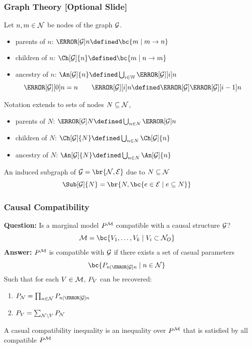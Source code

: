 \documentclass[
    hyperref={colorlinks=true, linkcolor=blue, urlcolor=blue, citecolor=MidnightBlue},
    xcolor={dvipsnames},
]{beamer}
\renewcommand{\term}[1]{\textcolor{Mahogany}{#1}}
\begin{document}
\begin{frame}
    \frametitle{Graph Theory [Optional Slide]}
    Let $n, m \in \mathcal{N}$ be nodes of the graph $\mathcal{G}$.
    \begin{itemize}
        \item \term{parents of $n$}: $\Pa[\graph]{n} \defined \bc{m \mid m \to n}$
        \item \term{children of $n$}: $\Ch[\graph]{n} \defined \bc{m \mid n \to m}$
        \item \term{ancestry of $n$}: $\An[\graph]{n} \defined \bigcup_{i\in\mathbb{W}} \Pa[\graph][i]{n}$
        \[ \Pa[\graph][0]{n} = n \qquad \Pa[\graph][i]{n} \defined \Pa[\graph]{\Pa[\graph][i-1]{n}} \]
    \end{itemize}
    Notation extends to sets of nodes $N \subseteq \mathcal{N}$,
    \begin{itemize}
        \item \term{parents of $N$}: $\Pa[\graph]{N} \defined \bigcup_{n\in N}\Pa[\graph]{n}$
        \item \term{children of $N$}: $\Ch[\graph]{N} \defined \bigcup_{n\in N}\Ch[\graph]{n}$
        \item \term{ancestry of $N$}: $\An[\graph]{N} \defined \bigcup_{n\in N}\An[\graph]{n}$
    \end{itemize}
    An \term{induced subgraph} of $\graph = \br{\nodes, \edges}$ due to $N \subseteq \mathcal{N}$
    \[ \Sub[\graph]{N} = \br{N, \bc{e \in \edges \mid e \subseteq N}} \]
\end{frame}

\begin{frame}
    \frametitle{Causal Compatibility}
    \textbf{Question:} Is a marginal model $\prob^{\mscenario}$ \term{compatible} with a causal structure $\mathcal{G}$?\\
    \[ \mscenario = \bc{V_1, \ldots, V_k \mid V_i \subset \nodes_O} \]
    \textbf{Answer:} $\prob^{\mscenario}$ is compatible with $\mathcal{G}$ if there exists a set of \term{casual parameters}
    \[ \bc{\prob[n \mid \Pa[\graph]{n}] \mid n \in \nodes} \]
    Such that for each $V \in \mathcal{M}$, $\prob[V]$ can be recovered:
    \begin{enumerate}
        \item $\prob[\nodes] = \prod_{n\in\nodes}\prob[n \mid \Pa[\graph]{n}]$
        \item $\prob[V] = \sum_{\nodes \setminus V} \prob[\nodes]$
    \end{enumerate}

    A \term{casual compatibility inequality} is an inequality over $\prob^{\mscenario}$ that is satisfied by all compatible $\prob^{\mscenario}$
\end{frame}
\end{document}
